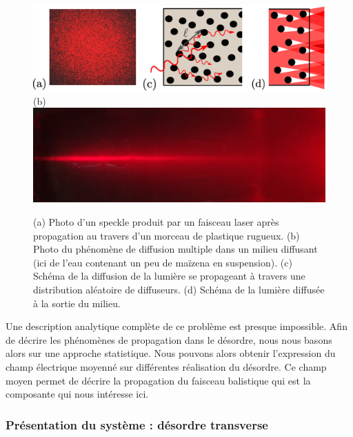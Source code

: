 \documentclass[a4paper,11pt]{article} %
\begin{document}
	\begin{figure}[h]
		\centering
		\begin{minipage}[c]{0.85\linewidth}
			\centering
			\includegraphics[width=0.85\linewidth]{./Illustrations/figure_scatt.eps} \\
			(b) \hspace{0.1cm} \includegraphics[width=0.8\linewidth]{./Illustrations/Photo_diff_desordre_3D}
			\caption{(a) Photo d'un speckle produit par un faisceau laser après propagation au travers d'un morceau de plastique rugueux. (b) Photo du phénomène de diffusion multiple dans un milieu diffusant (ici de l'eau contenant un peu de maïzena en suspension). (c) Schéma de la diffusion de la lumière se propageant à travers une distribution aléatoire de diffuseurs. (d) Schéma de la lumière diffusée à la sortie du milieu.}
			\label{fig:diffusion_desordre_3D}
		\end{minipage}
	\end{figure}	
	
	Une description analytique complète de ce problème est presque impossible. Afin de décrire les phénomènes de propagation dans le désordre, nous nous basons alors sur une approche statistique. Nous pouvons alors obtenir l'expression du champ électrique moyenné sur différentes réalisation du désordre. Ce champ moyen permet de décrire la propagation du faisceau balistique qui est la composante qui nous intéresse ici.
	
	
	\subsubsection{Présentation du système : désordre transverse}
	
\end{document}
